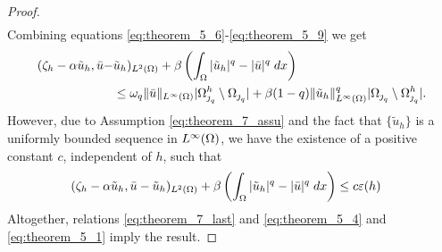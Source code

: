 {\begin{proof}
\begin{equation}
\begin{split}
    \end{split}
\end{equation}
Combining equations \eqref{eq:theorem_5_6}-\eqref{eq:theorem_5_9} we get
\begin{equation}\label{eq:theorem_5_10}
\begin{split}
    (\zeta_h-\alpha \tilde u_h,\bar u-&\tilde u_h)_{L^2(\Omega)}+\beta \left(\int_{\Omega}|\tilde u_h|^q-|\bar u|^q\; dx\right)\\
    &\le  \omega_q \lVert \bar u \rVert_{L^\infty(\Omega)} |{\Omega^h_{\operatorname{\jmath}_q}}\setminus {\Omega_{\operatorname{\jmath}_q}}|+\beta(1-q)\lVert \tilde u_h \rVert^q_{L^\infty(\Omega)}|\Omega_{\operatorname{\jmath}_q}\setminus \Omega^h_{\operatorname{\jmath}_q}|.
    \end{split}
\end{equation}
However, due to Assumption \eqref{eq:theorem_7_assu} and the fact that $\{\tilde u_h \}$ is a uniformly bounded sequence in $L^\infty(\Omega)$, we have the existence of a positive constant $c$, independent of $h$, such that
\begin{align}
    (\zeta_h-\alpha \tilde u_h,\bar u-\tilde u_h)_{L^2(\Omega)}+\beta \left(\int_{\Omega}|\tilde u_h|^q-|\bar u|^q\; dx\right)&\le  c\varepsilon(h) \label{eq:theorem_7_last}
\end{align}
Altogether, relations \eqref{eq:theorem_7_last} and \eqref{eq:theorem_5_4} and \eqref{eq:theorem_5_1} imply the result.
\end{proof}

}
